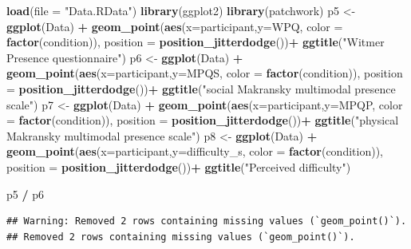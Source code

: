\documentclass[
]{article}
\newenvironment{Shaded}{\begin{snugshade}}{\end{snugshade}}
\newcommand{\AttributeTok}[1]{\textcolor[rgb]{0.13,0.29,0.53}{#1}}
\newcommand{\FunctionTok}[1]{\textcolor[rgb]{0.13,0.29,0.53}{\textbf{#1}}}
\newcommand{\NormalTok}[1]{#1}
\newcommand{\OtherTok}[1]{\textcolor[rgb]{0.56,0.35,0.01}{#1}}
\newcommand{\SpecialCharTok}[1]{\textcolor[rgb]{0.81,0.36,0.00}{\textbf{#1}}}
\newcommand{\StringTok}[1]{\textcolor[rgb]{0.31,0.60,0.02}{#1}}
\begin{document}
\begin{Shaded}
\begin{Highlighting}[]
\FunctionTok{load}\NormalTok{(}\AttributeTok{file =} \StringTok{"Data.RData"}\NormalTok{)}
\FunctionTok{library}\NormalTok{(ggplot2)}
\FunctionTok{library}\NormalTok{(patchwork)}
\NormalTok{p5 }\OtherTok{\textless{}{-}} \FunctionTok{ggplot}\NormalTok{(Data) }\SpecialCharTok{+}
  \FunctionTok{geom\_point}\NormalTok{(}\FunctionTok{aes}\NormalTok{(}\AttributeTok{x=}\NormalTok{participant,}\AttributeTok{y=}\NormalTok{WPQ, }\AttributeTok{color =} \FunctionTok{factor}\NormalTok{(condition)), }\AttributeTok{position =} \FunctionTok{position\_jitterdodge}\NormalTok{())}\SpecialCharTok{+}
  \FunctionTok{ggtitle}\NormalTok{(}\StringTok{"Witmer Presence questionnaire"}\NormalTok{)}
\NormalTok{p6 }\OtherTok{\textless{}{-}} \FunctionTok{ggplot}\NormalTok{(Data) }\SpecialCharTok{+}
  \FunctionTok{geom\_point}\NormalTok{(}\FunctionTok{aes}\NormalTok{(}\AttributeTok{x=}\NormalTok{participant,}\AttributeTok{y=}\NormalTok{MPQS, }\AttributeTok{color =} \FunctionTok{factor}\NormalTok{(condition)), }\AttributeTok{position =} \FunctionTok{position\_jitterdodge}\NormalTok{())}\SpecialCharTok{+}
  \FunctionTok{ggtitle}\NormalTok{(}\StringTok{"social Makransky multimodal presence scale"}\NormalTok{)}
\NormalTok{p7 }\OtherTok{\textless{}{-}} \FunctionTok{ggplot}\NormalTok{(Data) }\SpecialCharTok{+}
  \FunctionTok{geom\_point}\NormalTok{(}\FunctionTok{aes}\NormalTok{(}\AttributeTok{x=}\NormalTok{participant,}\AttributeTok{y=}\NormalTok{MPQP, }\AttributeTok{color =} \FunctionTok{factor}\NormalTok{(condition)), }\AttributeTok{position =} \FunctionTok{position\_jitterdodge}\NormalTok{())}\SpecialCharTok{+}
  \FunctionTok{ggtitle}\NormalTok{(}\StringTok{"physical Makransky multimodal presence scale"}\NormalTok{)}
\NormalTok{p8 }\OtherTok{\textless{}{-}} \FunctionTok{ggplot}\NormalTok{(Data) }\SpecialCharTok{+}
  \FunctionTok{geom\_point}\NormalTok{(}\FunctionTok{aes}\NormalTok{(}\AttributeTok{x=}\NormalTok{participant,}\AttributeTok{y=}\NormalTok{difficulty\_s, }\AttributeTok{color =} \FunctionTok{factor}\NormalTok{(condition)), }\AttributeTok{position =} \FunctionTok{position\_jitterdodge}\NormalTok{())}\SpecialCharTok{+}
  \FunctionTok{ggtitle}\NormalTok{(}\StringTok{"Perceived difficulty"}\NormalTok{)}

\NormalTok{p5 }\SpecialCharTok{/}\NormalTok{ p6 }
\end{Highlighting}
\end{Shaded}

\begin{verbatim}
## Warning: Removed 2 rows containing missing values (`geom_point()`).
## Removed 2 rows containing missing values (`geom_point()`).
\end{verbatim}
\end{document}
